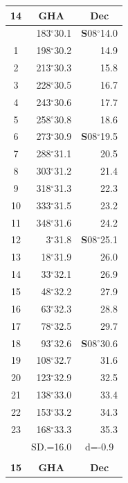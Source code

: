 \documentclass[10pt, a4paper]{report}
\begin{document}
\begin{scriptsize}
\noindent
\begin{tabular*}{0.2\textwidth}[t]{@{\extracolsep{\fill}}|c|rr|}
\hline
\multicolumn{1}{|c|}{\rule{0pt}{2.6ex}\textbf{14}} & \multicolumn{1}{c}{\textbf{GHA}} & \multicolumn{1}{c|}{\textbf{Dec}}\\
\hline\rule{0pt}{2.6ex}\noindent
0 & 183$^\circ$30.1 & \textbf{S}08$^\circ$14.0\\
1 & 198$^\circ$30.2 & 14.9\\
2 & 213$^\circ$30.3 & 15.8\\
3 & 228$^\circ$30.5 & \raisebox{0.24ex}{\boldmath$\cdot$~\boldmath$\cdot$~~}16.7\\
4 & 243$^\circ$30.6 & 17.7\\
5 & 258$^\circ$30.8 & 18.6\\[2Pt]
6 & 273$^\circ$30.9 & \textbf{S}08$^\circ$19.5\\
7 & 288$^\circ$31.1 & 20.5\\
8 & 303$^\circ$31.2 & 21.4\\
9 & 318$^\circ$31.3 & \raisebox{0.24ex}{\boldmath$\cdot$~\boldmath$\cdot$~~}22.3\\
10 & 333$^\circ$31.5 & 23.2\\
11 & 348$^\circ$31.6 & 24.2\\[2Pt]
12 & 3$^\circ$31.8 & \textbf{S}08$^\circ$25.1\\
13 & 18$^\circ$31.9 & 26.0\\
14 & 33$^\circ$32.1 & 26.9\\
15 & 48$^\circ$32.2 & \raisebox{0.24ex}{\boldmath$\cdot$~\boldmath$\cdot$~~}27.9\\
16 & 63$^\circ$32.3 & 28.8\\
17 & 78$^\circ$32.5 & 29.7\\[2Pt]
18 & 93$^\circ$32.6 & \textbf{S}08$^\circ$30.6\\
19 & 108$^\circ$32.7 & 31.6\\
20 & 123$^\circ$32.9 & 32.5\\
21 & 138$^\circ$33.0 & \raisebox{0.24ex}{\boldmath$\cdot$~\boldmath$\cdot$~~}33.4\\
22 & 153$^\circ$33.2 & 34.3\\
23 & 168$^\circ$33.3 & 35.3\\
\hline
\rule{0pt}{2.4ex} & \multicolumn{1}{c}{SD.=16.0} & \multicolumn{1}{c|}{d=-0.9}\\
\hline
\multicolumn{1}{c}{}\\[-0.5ex]\hline
\multicolumn{1}{|c|}{\rule{0pt}{2.6ex}\textbf{15}} & \multicolumn{1}{c}{\textbf{GHA}} & \multicolumn{1}{c|}{\textbf{Dec}}\\

\end{tabular*}
\end{scriptsize}
\end{document}
